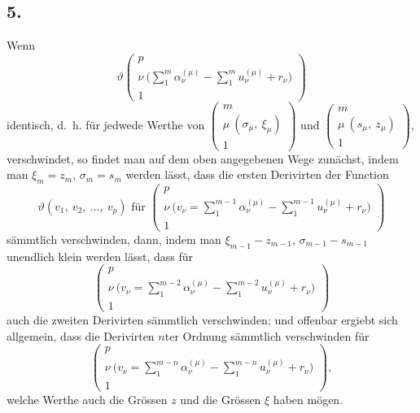 \documentclass[12pt,a4paper]{book}
\theoremstyle{definition}
\theoremstyle{remark}
\begin{document}
\subsection*{5.}

Wenn
\begin{equation}
\tag{1} \vartheta\left(\begin{array}{c} p\\ \nu\ \bigl(\sum\limits_1^m \alpha_\nu^{(\mu)} - \sum\limits_1^m u_\nu^{(\mu)} + r_\nu\bigr)\\ 1 \end{array}\right) \end{equation}
identisch, d.~h. für jedwede Werthe von $\left(\begin{array}{c} m\\ \mu\ (\sigma_\mu,\ \xi_\mu)\\ 1 \end{array}\right)$ und $\left(\begin{array}{c} m\\ \mu\ (s_\mu,\ z_\mu)\\ 1 \end{array}\right)$, verschwindet, so findet man auf dem oben angegebenen Wege zunächst, indem man $\xi_m = z_m$, $\sigma_m = s_m$ werden lässt, dass die ersten Derivirten der Function
\[ \vartheta(v_1,\ v_2,\ \ldots,\ v_p) \text{ für } \left(\begin{array}{c} p\\ \nu\ \bigl(v_\nu = \sum\limits_1^{m-1} \alpha_\nu^{(\mu)} - \sum\limits_1^{m-1} u_\nu^{(\mu)} + r_\nu\bigr)\\ 1 \end{array}\right) \]
sämmtlich verschwinden, dann, indem man $\xi_{m-1} - z_{m-1}$, $\sigma_{m-1} - s_{m-1}$ unendlich klein werden lässt, dass für
\[ \left(\begin{array}{c} p\\ \nu\ \bigl(v_\nu = \sum\limits_1^{m-2} \alpha_\nu^{(\mu)} - \sum\limits_1^{m-2} u_\nu^{(\mu)} + r_\nu\bigr)\\ 1 \end{array}\right) \]
auch die zweiten Derivirten sämmtlich verschwinden; und offenbar ergiebt sich allgemein, dass die Derivirten $n$ter Ordnung sämmtlich verschwinden für
\[ \left(\begin{array}{c} p\\ \nu\ \bigl(v_\nu = \sum\limits_1^{m-n} \alpha_\nu^{(\mu)} - \sum\limits_1^{m-n} u_\nu^{(\mu)} + r_\nu\bigr)\\ 1 \end{array}\right), \]
welche Werthe auch die Grössen $z$ und die Grössen $\xi$ haben mögen.
\end{document}
